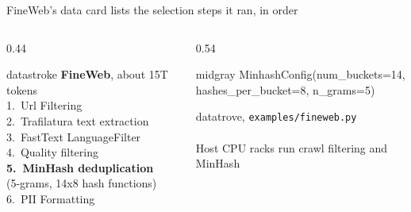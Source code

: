 \documentclass[aspectratio=169, 12pt]{beamer}
\begin{document}
\begin{frame}{FineWeb's data card lists the selection steps it ran, in order}
  \begin{columns}[T]
    \begin{column}{0.44\textwidth}
      \vspace{0pt}\begin{mlsyscard}{datastroke}
        \small\textbf{FineWeb}, about 15T tokens\\[0.1cm]
        1.\ Url Filtering\\
        2.\ Trafilatura text extraction\\
        3.\ FastText LanguageFilter\\
        4.\ Quality filtering\\
        \textcolor{mlsysaccent}{\textbf{5.\ MinHash deduplication}}\\
        \hspace*{1em}\textcolor{mlsysaccent}{(5-grams, 14x8 hash functions)}\\
        6.\ PII Formatting
      \end{mlsyscard}
    \end{column}
    \begin{column}{0.54\textwidth}
      \vspace{0pt}\begin{mlsyscard}{midgray}
        \ttfamily\footnotesize
        MinhashConfig(num\_buckets=14,\\
        \hspace*{1.6em}hashes\_per\_bucket=8, n\_grams=5)
      \end{mlsyscard}
      {\scriptsize\textcolor{midgray}{datatrove, \texttt{examples/fineweb.py}}}\\[0.06cm]
      \centering{}\\[0.01cm]
      {\scriptsize\textcolor{midgray}{Host CPU racks run crawl filtering and MinHash}}
    \end{column}
  \end{columns}
\end{frame}
\end{document}
